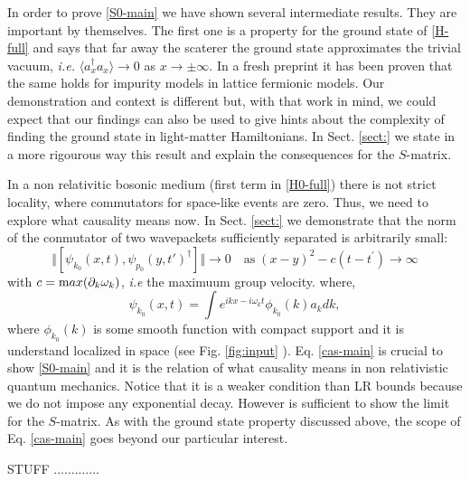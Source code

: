 \documentclass[notitlepage, prx, preprint, amsmath,superscriptaddress,amssymb]{revtex4-1}
\begin{document}
In order to prove \eqref{S0-main}   we have shown several  intermediate results.
They are important by themselves.    The first one is a property for the ground state of \eqref{H-full} and says that far away the scaterer the ground state  approximates the trivial vacuum, \emph{i.e.}  $\langle a_x^\dagger a_x \rangle \to 0$ as $x \to \pm \infty$.  
In a fresh preprint it has been proven that the same holds for impurity models in lattice fermionic models.  Our demonstration and context is  different but, with that work in mind, we could expect that our findings can also be used to give hints about the complexity of finding the ground state in light-matter Hamiltonians.  In Sect. \ref{sect:} we state in a more rigourous way this result and explain the consequences for the $S$-matrix.


In  a non relativitic bosonic medium (first term in \eqref{H0-full}) there is not strict locality, where commutators for space-like events are zero.  Thus, we need to explore what causality means now. In Sect. \ref{sect:}   we demonstrate that the norm of the  conmutator of two wavepackets sufficiently separated  is arbitrarily small:
\begin{equation}
\label{cas-main}
\Vert[\psi_{k_0}(x,t),\psi_{p_0}(y,t')^\dagger]\Vert \to 0  \quad
\text{as} \;  (x-y)^2 -c (t-t^\prime) \to \infty
\end{equation}
with $c= {\text max} ( \partial_k \omega_k )$, \emph{i.e} the maximuum group velocity.  where,
\begin{equation}
\label{wp}
\psi_{k_0}(x,t) = \int  e^{ikx-i\omega_kt} \phi_{k_0}(k) a_k dk,
\end{equation}
where $\phi_{k_0} (k)$ is some smooth function with compact support and it is understand localized in space (see Fig. \ref{fig:input} ).   
Eq. \eqref{cas-main} is crucial to show \eqref{S0-main} and it is the relation of what causality means in non relativistic quantum mechanics.  Notice that it is a weaker condition than LR bounds because we do not impose any exponential decay.  However is sufficient to show the limit for the $S$-matrix.  As with the ground state property discussed above,  the scope of  Eq. \eqref{cas-main} goes beyond  our particular interest.




 STUFF .............
\end{document}
